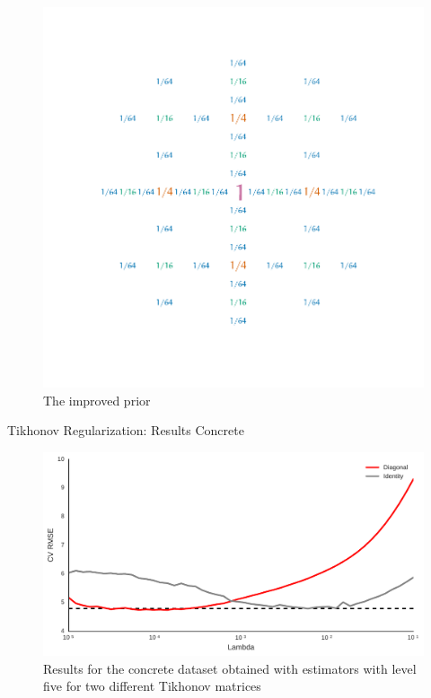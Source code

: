 \documentclass{beamer}
\begin{document}
  \begin{frame}[plain]
    \begin{figure}[H]
      \centering
      \includegraphics[width=1\textwidth, clip, trim={0 2.3cm 0 2cm}]{diagonal}
      \caption{The improved prior}
    \end{figure}
  \end{frame}
 

\begin{frame}{Tikhonov Regularization: Results Concrete}
\begin{figure}[H]
\centering
\includegraphics[width=\textwidth]{tikhonov_concrete_l5}
\caption{Results for the concrete dataset obtained with estimators with level
five for two different Tikhonov matrices}
\end{figure}
\end{frame}
   
\end{document}
